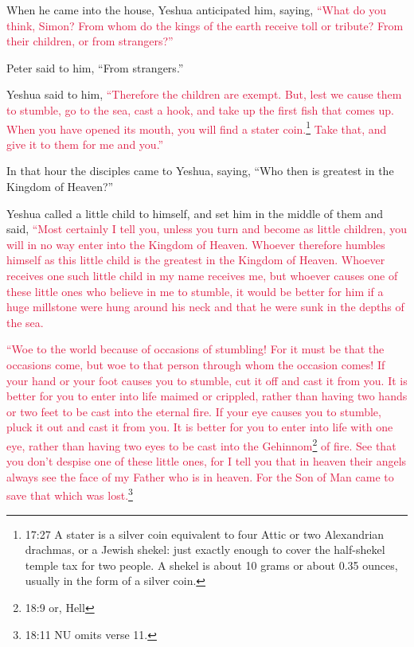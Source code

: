 When he came into the house, Yeshua anticipated him, saying,
\textcolor{crimson}{“What do you think, Simon? From whom do the kings of the earth receive toll or tribute? From their
	children, or from strangers?”}

\myverse{}Peter said to him, “From strangers.”

Yeshua said to him,
\textcolor{crimson}{“Therefore the children are exempt.
}
\myverse{}\textcolor{crimson}{But, lest we cause them to stumble, go to the sea, cast a hook, and take
	up the first fish that comes up. When you have opened its mouth, you will find a stater coin.}\footnote{17:27 A stater is a silver coin equivalent to four Attic or two Alexandrian drachmas, or a Jewish shekel:
	just exactly enough to cover the half-shekel temple tax for two people. A shekel is about 10 grams or
	about 0.35 ounces, usually in the form of a silver coin.}
\textcolor{crimson}{Take that, and give it to them for me and you.”}


\mychapter{} \myverse*{}In that hour the disciples came to Yeshua, saying, “Who then is
greatest in the Kingdom of Heaven?”

\quad\quad \myverse{}Yeshua called a little child to himself, and set him in the middle
of them
\myverse{}and said,
\textcolor{crimson}{“Most certainly I tell you, unless you turn and become as little children, you will in no way enter
	into the Kingdom of Heaven.
}
\myverse{}\textcolor{crimson}{Whoever therefore humbles himself as this little child is the greatest
	in the Kingdom of Heaven.
}
\myverse{}\textcolor{crimson}{Whoever receives one such little child in my name receives me,
}
\myverse{}\textcolor{crimson}{but whoever causes one of these little ones who believe in me to stumble,
	it would be better for him if a huge millstone were hung around his neck and that he were sunk in the
	depths of the sea.
}

\myverse{}\textcolor{crimson}{“Woe to the world because of occasions of stumbling! For it
	must be that the occasions come, but woe to that person through whom the occasion comes!
}
\myverse{}\textcolor{crimson}{If your hand or your foot causes you to stumble, cut it off and cast it
	from you. It is better for you to enter into life maimed or crippled, rather than having two hands or
	two feet to be cast into the eternal fire.
}
\myverse{}\textcolor{crimson}{If your eye causes you to stumble, pluck it out and cast it from you. It
	is better for you to enter into life with one eye, rather than having two eyes to be cast into the Gehinnom}\footnote{18:9 or, Hell}
\textcolor{crimson}{of fire.
}
\myverse{}\textcolor{crimson}{See that you don’t despise one of these little ones, for I tell you that
	in heaven their angels always see the face of my Father who is in heaven.
}
\myverse{}\textcolor{crimson}{For the Son of Man came to save that which was lost.}\footnote{18:11 NU omits verse 11.}


